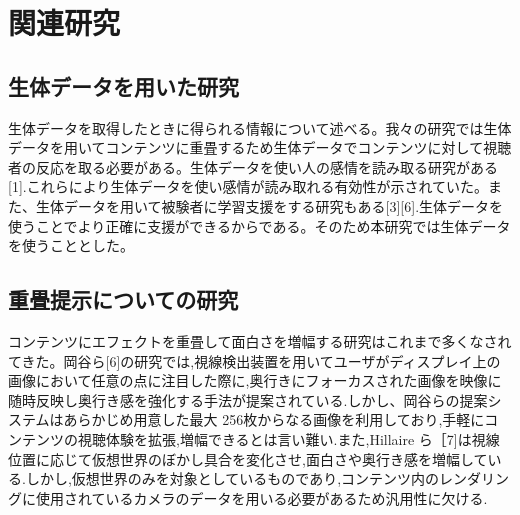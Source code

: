 \thispagestyle{myheadings}
\chapter{関連研究}


\section{生体データを用いた研究}
生体データを取得したときに得られる情報について述べる。我々の研究では生体データを用いてコンテンツに重畳するため生体データでコンテンツに対して視聴者の反応を取る必要がある。生体データを使い人の感情を読み取る研究がある[1].これらにより生体データを使い感情が読み取れる有効性が示されていた。また、生体データを用いて被験者に学習支援をする研究もある[3][6].生体データを使うことでより正確に支援ができるからである。そのため本研究では生体データを使うこととした。


\section{重畳提示についての研究}
コンテンツにエフェクトを重畳して面白さを増幅する研究はこれまで多くなされてきた。岡谷ら[6]の研究では,視線検出装置を用いてユーザがディスプレイ上の画像において任意の点に注目した際に,奥行きにフォーカスされた画像を映像に随時反映し奥行き感を強化する手法が提案されている.しかし、岡谷らの提案システムはあらかじめ用意した最大 256枚からなる画像を利用しており,手軽にコンテンツの視聴体験を拡張,増幅できるとは言い難い.また,Hillaire ら［7]は視線位置に応じて仮想世界のぼかし具合を変化させ,面白さや奥行き感を増幅している.しかし,仮想世界のみを対象としているものであり,コンテンツ内のレンダリングに使用されているカメラのデータを用いる必要があるため汎用性に欠ける.



